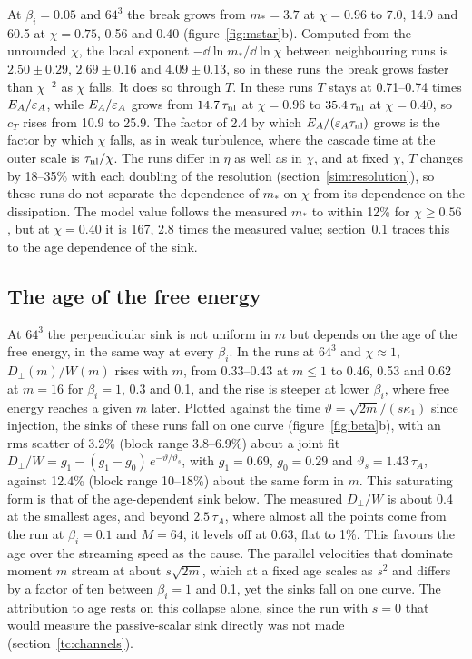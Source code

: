At $\beta_i=0.05$ and $64^3$ the break grows from $m_*=3.7$ at $\chi=0.96$ to 7.0, 14.9 and 60.5 at $\chi=0.75$, 0.56 and 0.40 (figure~\ref{fig:mstar}b). Computed from the unrounded $\chi$, the local exponent $-\dd\ln m_*/\dd\ln\chi$ between neighbouring runs is $2.50\pm0.29$, $2.69\pm0.16$ and $4.09\pm0.13$, so in these runs the break grows faster than $\chi^{-2}$ as $\chi$ falls. It does so through $T$. In these runs $T$ stays at 0.71--0.74 times $E_A/\varepsilon_A$, while $E_A/\varepsilon_A$ grows from $14.7\,\tau_{\rm nl}$ at $\chi=0.96$ to $35.4\,\tau_{\rm nl}$ at $\chi=0.40$, so $c_T$ rises from 10.9 to 25.9. The factor of 2.4 by which $E_A/(\varepsilon_A\tau_{\rm nl})$ grows is the factor by which $\chi$ falls, as in weak turbulence, where the cascade time at the outer scale is $\tau_{\rm nl}/\chi$. The runs differ in $\eta$ as well as in $\chi$, and at fixed $\chi$, $T$ changes by 18--35\% with each doubling of the resolution (section~\ref{sim:resolution}), so these runs do not separate the dependence of $m_*$ on $\chi$ from its dependence on the dissipation. The model value follows the measured $m_*$ to within 12\% for $\chi\ge0.56$, but at $\chi=0.40$ it is 167, 2.8 times the measured value; section~\ref{sim:beta} traces this to the age dependence of the sink.

\subsection{The age of the free energy}\label{sim:beta}

At $64^3$ the perpendicular sink is not uniform in $m$ but depends on the age of the free energy, in the same way at every $\beta_i$. In the runs at $64^3$ and $\chi\approx1$, $D_\perp(m)/W(m)$ rises with $m$, from 0.33--0.43 at $m\le1$ to 0.46, 0.53 and 0.62 at $m=16$ for $\beta_i=1$, 0.3 and 0.1, and the rise is steeper at lower $\beta_i$, where free energy reaches a given $m$ later. Plotted against the time $\vartheta=\sqrt{2m}/(s\kappa_1)$ since injection, the sinks of these runs fall on one curve (figure~\ref{fig:beta}b), with an rms scatter of 3.2\% (block range 3.8--6.9\%) about a joint fit $D_\perp/W=g_1-(g_1-g_0)\,e^{-\vartheta/\vartheta_s}$, with $g_1=0.69$, $g_0=0.29$ and $\vartheta_s=1.43\,\tau_A$, against 12.4\% (block range 10--18\%) about the same form in $m$. This saturating form is that of the age-dependent sink below. The measured $D_\perp/W$ is about 0.4 at the smallest ages, and beyond $2.5\,\tau_A$, where almost all the points come from the run at $\beta_i=0.1$ and $M=64$, it levels off at 0.63, flat to 1\%.
This favours the age over the streaming speed as the cause. The parallel velocities that dominate moment $m$ stream at about $s\sqrt{2m}$, which at a fixed age scales as $s^2$ and differs by a factor of ten between $\beta_i=1$ and 0.1, yet the sinks fall on one curve. The attribution to age rests on this collapse alone, since the run with $s=0$ that would measure the passive-scalar sink directly was not made (section~\ref{tc:channels}).


